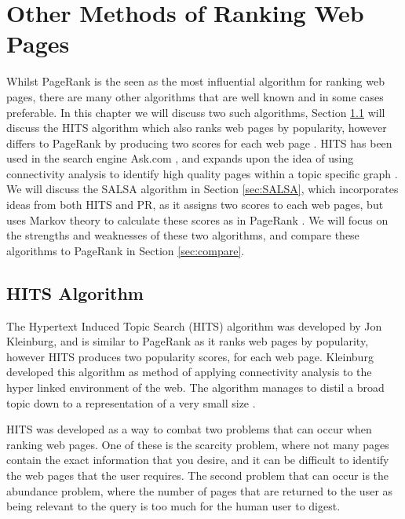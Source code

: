 \documentclass[11pt]{report}
\begin{document}
\chapter{Other Methods of Ranking Web Pages}\label{chap:Other}
Whilst PageRank is the seen as the most influential algorithm for ranking web pages, there are many other algorithms that are well known and in some cases preferable. In this chapter we will discuss two such algorithms, Section \ref{sec:HITS} will discuss the HITS algorithm which also ranks web pages by popularity, however differs to PageRank by producing two scores for each web page \cite{kleinberg1999authoritative}. HITS has been used in the search engine Ask.com \cite{bonato}, and expands upon the idea of using connectivity analysis to identify high quality pages within a topic specific graph \cite{manning}. We will discuss the SALSA algorithm in Section \ref{sec:SALSA}, which incorporates ideas from both HITS and PR, as it assigns two scores to each web pages, but uses Markov theory to calculate these scores as in PageRank \cite{lempel2000stochastic}. We will focus on the strengths and weaknesses of these two algorithms, and compare these algorithms to PageRank in Section \ref{sec:compare}.

\section{HITS Algorithm} \label{sec:HITS}
The Hypertext Induced Topic Search (HITS) algorithm was developed by Jon Kleinburg, and is similar to PageRank as it ranks web pages by popularity, however HITS produces two popularity scores, for each web page.  Kleinburg developed this algorithm as method of applying connectivity analysis to the hyper linked environment of the web. The algorithm manages to distil a broad topic down to a representation of a very small size \cite{kleinberg1999authoritative}.

HITS was developed as a way to combat two problems that can occur when ranking web pages. One of these is the scarcity problem, where not many pages contain the exact information that you desire, and it can be difficult to identify the web pages that the user requires. The second problem that can occur is the abundance problem, where the number of pages that are returned to the user as being relevant to the query is too much for the human user to digest. 
\end{document}
